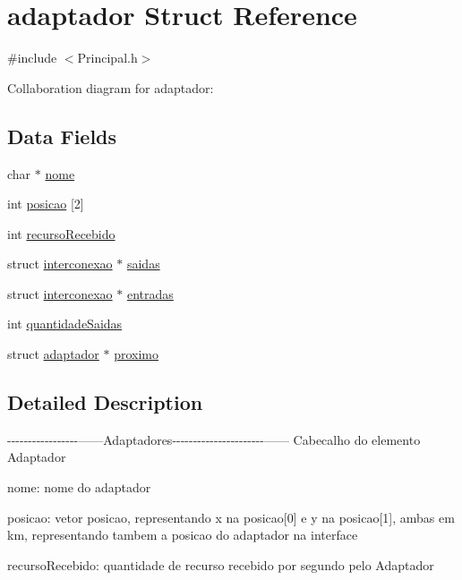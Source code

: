 \hypertarget{structadaptador}{\section{adaptador Struct Reference}
\label{structadaptador}
}


{\ttfamily \#include $<$Principal.\-h$>$}



Collaboration diagram for adaptador\-:
\subsection*{Data Fields}
\begin{DoxyCompactItemize}
\item 
char $\ast$ \hyperlink{structadaptador_ae2a0f66178bb1c4d42e2b70ec9426ccb}{nome}
\item 
int \hyperlink{structadaptador_a7e30d633898517077a4363ad6fade5b6}{posicao} \mbox{[}2\mbox{]}
\item 
int \hyperlink{structadaptador_a34541bd6c7eec1f2049716b02efe9572}{recurso\-Recebido}
\item 
struct \hyperlink{structinterconexao}{interconexao} $\ast$ \hyperlink{structadaptador_a788fad8a0ec948140f9c2a340be29a09}{saidas}
\item 
struct \hyperlink{structinterconexao}{interconexao} $\ast$ \hyperlink{structadaptador_ae28777a0a252764c89fe126c8d7fba4a}{entradas}
\item 
int \hyperlink{structadaptador_a135fa6c241ccfd74d2e8413ebefc0579}{quantidade\-Saidas}
\item 
struct \hyperlink{structadaptador}{adaptador} $\ast$ \hyperlink{structadaptador_a13b5e7e3587fb01bede3f317405b5af2}{proximo}
\end{DoxyCompactItemize}


\subsection{Detailed Description}
-\/-\/-\/-\/-\/-\/-\/-\/-\/-\/-\/-\/-\/-\/-\/-\/-\/------Adaptadores-\/-\/-\/-\/-\/-\/-\/-\/-\/-\/-\/-\/-\/-\/-\/-\/-\/-\/-\/-\/-\/-\/------ Cabecalho do elemento Adaptador

nome\-: nome do adaptador

posicao\-: vetor posicao, representando x na posicao\mbox{[}0\mbox{]} e y na posicao\mbox{[}1\mbox{]}, ambas em km, representando tambem a posicao do adaptador na interface

recurso\-Recebido\-: quantidade de recurso recebido por segundo pelo Adaptador

